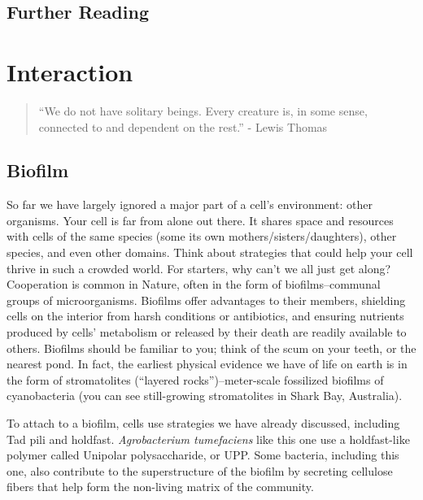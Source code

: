 \documentclass[]{tufte-book}
\begin{document}
\section{Further Reading}\label{further-reading-7}

\citep{fendrihan2006}

\citep{pletnev2015}

\citep{tocheva2016}

\citep{vreeland2000}

\chapter{Interaction}\label{interaction}

\begin{quote}
``We do not have solitary beings. Every creature is, in some sense,
connected to and dependent on the rest.'' - Lewis Thomas
\citep{thomas1974}
\end{quote}

\section{Biofilm}\label{biofilm}

So far we have largely ignored a major part of a cell's environment:
other organisms. Your cell is far from alone out there. It shares space
and resources with cells of the same species (some its own
mothers/sisters/daughters), other species, and even other domains. Think
about strategies that could help your cell thrive in such a crowded
world. For starters, why can't we all just get along? Cooperation is
common in Nature, often in the form of biofilms--communal groups of
microorganisms. Biofilms offer advantages to their members, shielding
cells on the interior from harsh conditions or antibiotics, and ensuring
nutrients produced by cells' metabolism or released by their death are
readily available to others. Biofilms should be familiar to you; think
of the scum on your teeth, or the nearest pond. In fact, the earliest
physical evidence we have of life on earth is in the form of
stromatolites (``layered rocks'')--meter-scale fossilized biofilms of
cyanobacteria (you can see still-growing stromatolites in Shark Bay,
Australia).

To attach to a biofilm, cells use strategies we have already discussed,
including Tad pili and holdfast. \emph{Agrobacterium tumefaciens} like
this one use a holdfast-like polymer called Unipolar polysaccharide, or
UPP. Some bacteria, including this one, also contribute to the
superstructure of the biofilm by secreting cellulose fibers that help
form the non-living matrix of the community.
\end{document}
